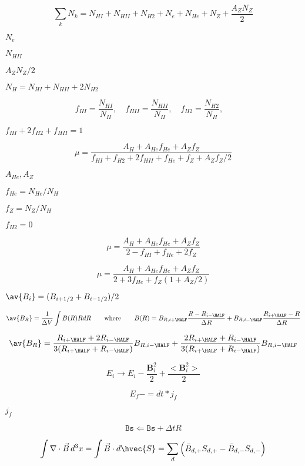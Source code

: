 \documentclass{article}
\begin{document}
\[
     \sum_k N_k = N_{HI} + N_{HII} + N_{H2} + N_e + N_{He} + N_Z
                 + \frac{A_ZN_Z}{2}
   \]
\pagebreak

$ N_e $
\pagebreak

$ N_{HII} $
\pagebreak

$ A_ZN_Z/2 $
\pagebreak

$ N_H = N_{HI} + N_{HII} + 2N_{H2} $
\pagebreak

\[
      f_{HI}  = \frac{N_{HI}}{N_H},\quad
      f_{HII} = \frac{N_{HII}}{N_H},\quad
      f_{H2}  = \frac{N_{H2}}{N_H},\quad
   \]
\pagebreak

$ f_{HI} + 2f_{H2} + f_{HII} = 1 $
\pagebreak

\[
   \mu = \frac{A_H + A_{He}f_{He} + A_Zf_Z}
              {f_{HI} + f_{H2} + 2f_{HII} + f_{He} + f_Z + A_Z f_Z/2}
\]
\pagebreak

$A_{He}, A_Z $
\pagebreak

$f_{He} = N_{He}/N_H$
\pagebreak

$f_Z = N_Z/N_H$
\pagebreak

$ f_{H2} = 0$
\pagebreak

\[
      \mu = \frac{A_H + A_{He}f_{He} + A_Zf_Z}
                 {2 - f_{HI} + f_{He} + 2f_Z}
   \]
\pagebreak

\[
      \mu = \frac{A_H + A_{He}f_{He} + A_Zf_Z}{2  + 3f_{He} + f_Z(1 + A_Z/2)}
   \]
\pagebreak

$ \av{B_i} = (B_{i+1/2} + B_{i-1/2})/2$
\pagebreak

\[
  \av{B_R} = \frac{1}{\Delta V} \int B(R) R dR 
   \qquad\mathrm{where}\qquad
    B(R) =   B_{R,i+\HALF} \frac{R - R_{i-\HALF}}{\Delta R} 
           + B_{R,i-\HALF} \frac{R_{i+\HALF} - R}{\Delta R}
\]
\pagebreak

\[
  \av{B_R} =  \frac{R_{i+\HALF} + 2R_{i-\HALF}}{3(R_{i+\HALF}+R_{i-\HALF})}
               B_{R,i-\HALF}
            + \frac{2R_{i+\HALF} + R_{i-\HALF}}{3(R_{i+\HALF}+R_{i-\HALF})}
               B_{R,i-\HALF}
\]
\pagebreak

\[ 
  E_i \to E_i - \frac{\mathbf{B}_i^2}{2} + \frac{<\mathbf{B}_i^2>}{2}
 \]
\pagebreak

\[
    E_f -= dt*j_f   
\]
\pagebreak

$ j_f $
\pagebreak

\[
  \mathtt{Bs} \Longleftarrow \mathtt{Bs} + \Delta t R
\]
\pagebreak

\[
     \int \nabla\cdot\vec{B}\, d^3x
   = \int \vec{B}\cdot d\hvec{S}
   = \sum_d \Big(\bar{B}_{d,+}S_{d,+} - \bar{B}_{d,-}S_{d,-} \Big)
\]
\pagebreak
\end{document}
